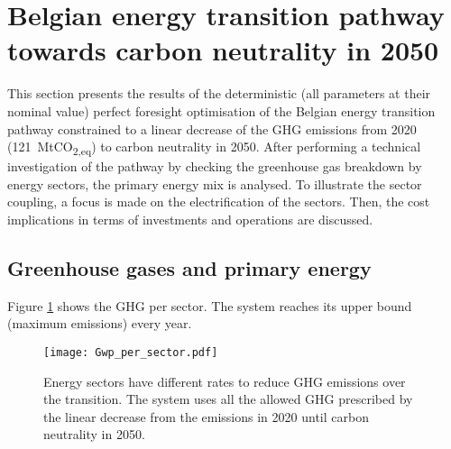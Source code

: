 \section{Belgian energy transition pathway towards carbon neutrality in 2050} 
\label{app:bel_PF_TD}
This section presents the results of the deterministic (\ie all parameters at their nominal value) perfect foresight optimisation of the Belgian energy transition pathway constrained to a linear decrease of the \gls{GHG} emissions from 2020 (121~MtCO\textsubscript{2,eq}) to carbon neutrality in 2050.  After performing a technical investigation of the pathway by checking the greenhouse gas breakdown by energy sectors, the primary energy mix is analysed. To illustrate the sector coupling, a focus is made on the electrification of the sectors. Then, the cost implications in terms of investments and operations are discussed.

\subsection{Greenhouse gases and primary energy}
Figure \ref{fig:pestd_ghg} shows the \acrfull{GHG} per sector. 
The system reaches its upper bound (\ie maximum emissions) every year. 

 \begin{figure}[!htbp]
\centering
\texttt{[image: Gwp\_per\_sector.pdf]}
\caption{Energy sectors have different rates to reduce \gls{GHG} emissions over the transition. The system uses all the allowed \gls{GHG} prescribed by the linear decrease from the emissions in 2020 until carbon neutrality in 2050.}
\label{fig:pestd_ghg}
\end{figure}

